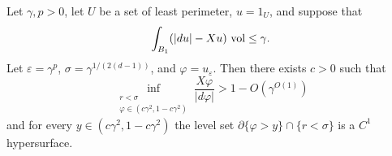 \begin{lemma}\label{main mollifier lemma}
Let $\gamma, p > 0$, let $U$ be a set of least perimeter, $u = 1_U$, and suppose that
\begin{equation}\label{hypothesis on main mollifier lemma}
\int_{B_1} (|du| - Xu) ~\mathrm{vol} \leq \gamma.
\end{equation}
Let $\varepsilon = \gamma^p$, $\sigma = \gamma^{1/(2(d - 1))}$, and $\varphi = u_\varepsilon$. Then there exists $c > 0$ such that
\begin{equation}\label{claim on main mollifier lemma}
\inf_{\substack{r < \sigma\\\varphi \in (c\gamma^2, 1 - c\gamma^2)}} \frac{X \varphi}{|d\varphi|} > 1 - O(\gamma^{O(1)})
\end{equation}
and for every $y \in (c\gamma^2, 1 - c\gamma^2)$ the level set $\partial \{\varphi > y\} \cap \{r < \sigma\}$ is a $C^1$ hypersurface.
\end{lemma}
